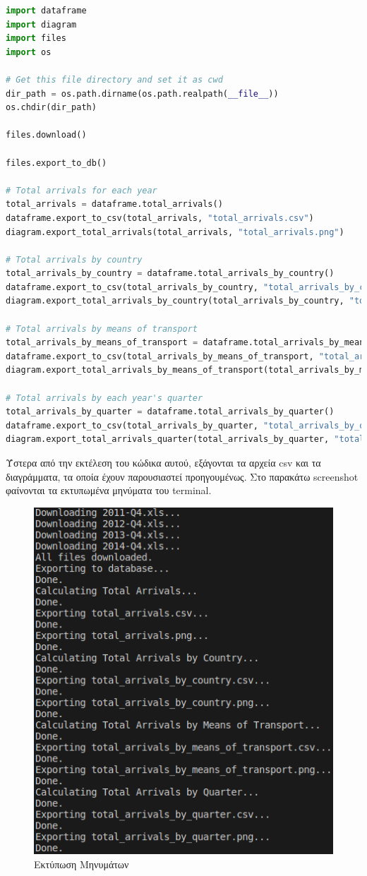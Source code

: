 \documentclass[a4paper]{article}
\begin{document}
\begin{lstlisting}[language=Python, caption=main.py]
import dataframe
import diagram
import files
import os

# Get this file directory and set it as cwd
dir_path = os.path.dirname(os.path.realpath(__file__))
os.chdir(dir_path)

files.download()

files.export_to_db()

# Total arrivals for each year
total_arrivals = dataframe.total_arrivals()
dataframe.export_to_csv(total_arrivals, "total_arrivals.csv")
diagram.export_total_arrivals(total_arrivals, "total_arrivals.png")

# Total arrivals by country
total_arrivals_by_country = dataframe.total_arrivals_by_country()
dataframe.export_to_csv(total_arrivals_by_country, "total_arrivals_by_country.csv")
diagram.export_total_arrivals_by_country(total_arrivals_by_country, "total_arrivals_by_country.png")

# Total arrivals by means of transport
total_arrivals_by_means_of_transport = dataframe.total_arrivals_by_means_of_transport()
dataframe.export_to_csv(total_arrivals_by_means_of_transport, "total_arrivals_by_means_of_transport.csv")
diagram.export_total_arrivals_by_means_of_transport(total_arrivals_by_means_of_transport, "total_arrivals_by_means_of_transport.png")

# Total arrivals by each year's quarter
total_arrivals_by_quarter = dataframe.total_arrivals_by_quarter()
dataframe.export_to_csv(total_arrivals_by_quarter, "total_arrivals_by_quarter.csv")
diagram.export_total_arrivals_quarter(total_arrivals_by_quarter, "total_arrivals_by_quarter.png")

\end{lstlisting}

Ύστερα από την εκτέλεση του κώδικα αυτού, εξάγονται τα αρχεία \textlatin{csv} και τα διαγράμματα, τα οποία έχουν παρουσιαστεί προηγουμένως. Στο παρακάτω \textlatin{screenshot} φαίνονται τα εκτυπωμένα μηνύματα του \textlatin{terminal}. 


\begin{figure}[H]
\centering
\includegraphics[scale=0.7]{terminal} 
\caption{Εκτύπωση Μηνυμάτων}
\label{fig:terminal}
\end{figure}
\end{document}
